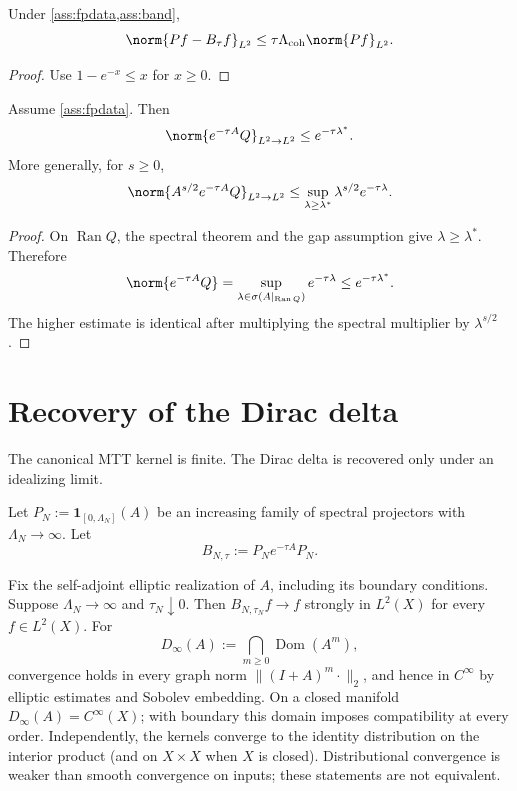 \documentclass[11pt]{article}
\begin{document}
\begin{corollary}\label{cor:smalltau}
Under \cref{ass:fpdata,ass:band},
\[
        \norm{Pf-B_\tau f}_{L^2}
        \le
        \tau\Lambda_{\mathrm{coh}}\norm{Pf}_{L^2}.
\]
\end{corollary}

\begin{proof}
Use \(1-e^{-x}\le x\) for \(x\ge0\).
\end{proof}

\begin{theorem}\label{thm:gap}
Assume \cref{ass:fpdata}. Then
\[
        \norm{e^{-\tau A}Q}_{L^2\to L^2}
        \le
        e^{-\tau\lambda^\ast}.
\]
More generally, for \(s\ge0\),
\[
        \norm{A^{s/2}e^{-\tau A}Q}_{L^2\to L^2}
        \le
        \sup_{\lambda\ge\lambda^\ast}\lambda^{s/2}e^{-\tau\lambda}.
\]
\end{theorem}

\begin{proof}
On \(\operatorname{Ran}Q\), the spectral theorem and the gap assumption give
\(\lambda\ge\lambda^\ast\). Therefore
\[
        \norm{e^{-\tau A}Q}
        =
        \sup_{\lambda\in\sigma(A|_{\operatorname{Ran}Q})}e^{-\tau\lambda}
        \le e^{-\tau\lambda^\ast}.
\]
The higher estimate is identical after multiplying the spectral multiplier by
\(\lambda^{s/2}\).
\end{proof}

\section{Recovery of the Dirac delta}

The canonical MTT kernel is finite. The Dirac delta is recovered only under an idealizing
limit.

Let \(P_N:=\mathbf 1_{[0,\Lambda_N]}(A)\) be an increasing family of spectral projectors
with \(\Lambda_N\to\infty\). Let
\[
        B_{N,\tau}:=P_Ne^{-\tau A}P_N.
\]

\begin{theorem}\label{thm:sharp}
Fix the self-adjoint elliptic realization of \(A\), including its boundary
conditions. Suppose \(\Lambda_N\to\infty\) and \(\tau_N\downarrow0\).
Then \(B_{N,\tau_N}f\to f\) strongly in \(L^2(X)\) for every \(f\in L^2(X)\).
For
\[
 D_\infty(A):=\bigcap_{m\geq0}\operatorname{Dom}(A^m),
\]
convergence holds in every graph norm \(\|(I+A)^m\cdot\|_2\), and hence in
\(C^\infty\) by elliptic estimates and Sobolev embedding. On a closed
manifold \(D_\infty(A)=C^\infty(X)\); with boundary this domain imposes
compatibility at every order. Independently, the kernels converge to the
identity distribution on the interior product (and on \(X\times X\) when
\(X\) is closed). Distributional convergence is weaker than smooth
convergence on inputs; these statements are not equivalent.
\end{theorem}
\end{document}

